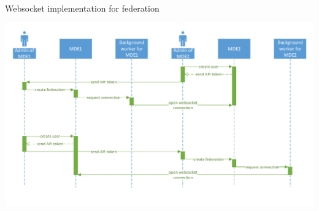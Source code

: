 \begin{frame}{Websocket implementation for federation}

    \includegraphics[width=\textwidth]{figures/mde-federation.pdf}

\end{frame}